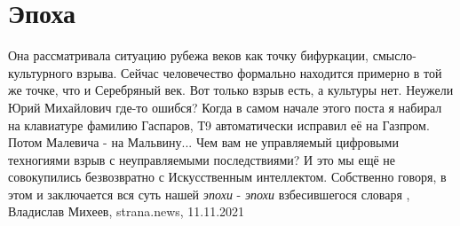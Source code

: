  
 
 
 
 
\chapter{Эпоха}
\label{sec:slova.epoha}

Она рассматривала ситуацию рубежа веков как точку бифуркации,
смысло-культурного взрыва.  Сейчас человечество формально находится примерно в
той же точке, что и Серебряный век.  Вот только взрыв есть, а культуры нет.
Неужели Юрий Михайлович где-то ошибся?  Когда в самом начале этого поста я
набирал на клавиатуре фамилию Гаспаров, Т9 автоматически исправил её на
Газпром.  Потом Малевича - на Мальвину...  Чем вам не управляемый цифровыми
техногиями взрыв с неуправляемыми последствиями?  И это мы ещё не совокупились
безвозвратно с Искусственным интеллектом.  Собственно говоря, в этом и
заключается вся суть нашей \emph{эпохи} - \emph{эпохи} взбесившегося словаря
, 
Владислав Михеев, strana.news, 11.11.2021
